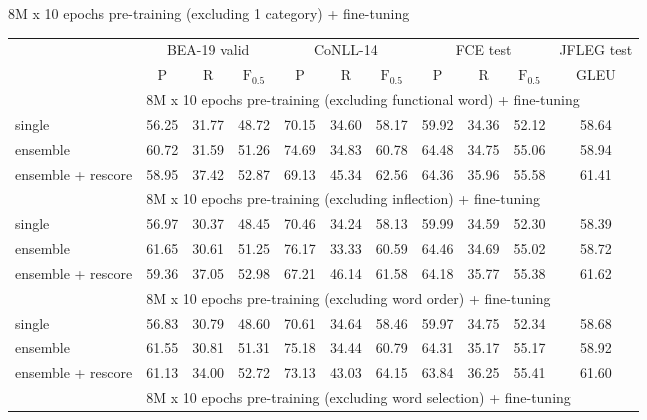 \documentclass[11pt]{article}
\begin{document}
\begin{multicols}{2}
	\begin{table}[H]
		\centering
		\tiny
		\tabcolsep 1.2pt
		8M x 10 epochs pre-training (excluding 1 category) + fine-tuning \\
		\begin{tabular}{@{\extracolsep{2.5pt}}l ccc|ccc|ccc|c@{}}
			\hline
			& \multicolumn{3}{c}{BEA-19 valid}
			& \multicolumn{3}{c}{CoNLL-14}
			& \multicolumn{3}{c}{FCE test}
			& \multicolumn{1}{c}{\hspace{-2em}JFLEG test\hspace{-2em}}
			\\ \cline{2-4} \cline{5-7} \cline{8-10} \cline{11-11}
			& P & R & $\textrm{F}_{0.5}$
			& P & R & $\textrm{F}_{0.5}$
			& P & R & $\textrm{F}_{0.5}$
			& GLEU \\
			\hline
			& \multicolumn{10}{l}{8M x 10 epochs pre-training (excluding functional word) + fine-tuning} \\
			single
			& 56.25 & 31.77 & 48.72 & 70.15 & 34.60 & 58.17 & 59.92 & 34.36 & 52.12 & 58.64 \\
			ensemble
			& 60.72 & 31.59 & 51.26 & 74.69 & 34.83 & 60.78 & 64.48 & 34.75 & 55.06 & 58.94 \\
			ensemble + rescore
			& 58.95 & 37.42 & 52.87 & 69.13 & 45.34 & 62.56 & 64.36 & 35.96 & 55.58 & 61.41 \\
			\hline
			& \multicolumn{10}{l}{8M x 10 epochs pre-training (excluding inflection) + fine-tuning} \\
			single
			& 56.97 & 30.37 & 48.45 & 70.46 & 34.24 & 58.13 & 59.99 & 34.59 & 52.30 & 58.39 \\
			ensemble
			& 61.65 & 30.61 & 51.25 & 76.17 & 33.33 & 60.59 & 64.46 & 34.69 & 55.02 & 58.72 \\
			ensemble + rescore
			& 59.36 & 37.05 & 52.98 & 67.21 & 46.14 & 61.58 & 64.18 & 35.77 & 55.38 & 61.62 \\
			\hline
			& \multicolumn{10}{l}{8M x 10 epochs pre-training (excluding word order) + fine-tuning} \\
			single
			& 56.83 & 30.79 & 48.60 & 70.61 & 34.64 & 58.46 & 59.97 & 34.75 & 52.34 & 58.68 \\ 
			ensemble
			& 61.55 & 30.81 & 51.31 & 75.18 & 34.44 & 60.79 & 64.31 & 35.17 & 55.17 & 58.92 \\
			ensemble + rescore
			& 61.13 & 34.00 & 52.72 & 73.13 & 43.03 & 64.15 & 63.84 & 36.25 & 55.41 & 61.60 \\
			\hline
			& \multicolumn{10}{l}{8M x 10 epochs pre-training (excluding word selection) + fine-tuning} \\

\end{tabular}
\end{table}
\end{multicols}
\end{document}
